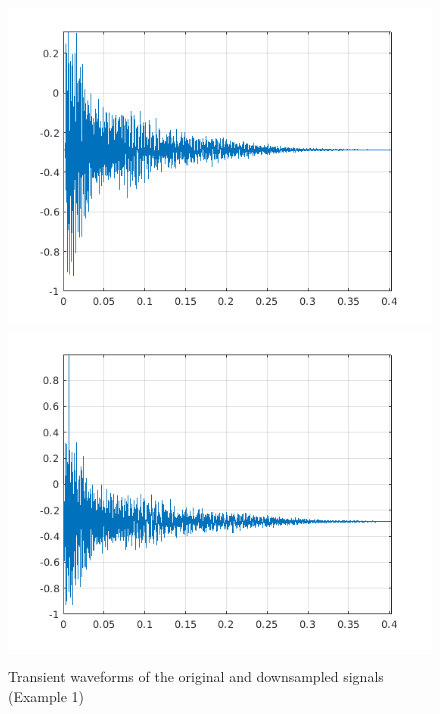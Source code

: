 \begin{figure}[!h]
{\begin{minipage}{\linewidth}
			\includegraphics[scale=0.45]{images/DownsamplingCircuit/outputL.png}
			\includegraphics[scale=0.45]{images/DownsamplingCircuit/outputR.png}
		\end{minipage}
}%
	\caption{Transient waveforms of the original and downsampled signals (Example 1)}%
	\label{fig:downsamplingWavEx1Signal}%
\end{figure}

